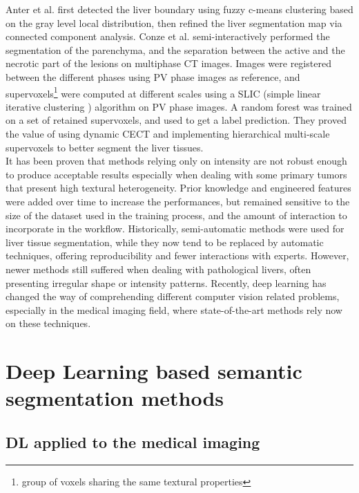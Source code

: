 Anter et al. \cite{Anter2014} first detected the liver boundary using fuzzy c-means
clustering based on the gray level local distribution, then refined the
liver segmentation map via connected component analysis. Conze et al. \cite{Conze2017} semi-interactively performed 
the segmentation of the parenchyma, and the separation between 
the active and the necrotic part of the lesions on multiphase CT images.
Images were registered between the different phases using PV phase images as reference, and
supervoxels\footnote{group of voxels sharing the same textural properties}
were computed at different scales using a SLIC (simple linear iterative clustering ) 
algorithm on PV phase images. A random forest was trained 
on a set of retained supervoxels, and used to get a label prediction. 
They proved the value of using dynamic CECT and implementing 
hierarchical multi-scale supervoxels to better segment the liver tissues.\\
It has been proven that methods relying only on intensity are not robust
enough to produce acceptable results especially when dealing with some
primary tumors that present high textural heterogeneity. Prior knowledge
and engineered features were added over time to increase the
performances, but remained sensitive to the size of the dataset used in
the training process, and the amount of interaction to incorporate in
the workflow.
Historically, semi-automatic methods were used for liver tissue
segmentation, while they now tend to be replaced by automatic
techniques, offering reproducibility and fewer interactions with
experts. However, newer methods still suffered when dealing with
pathological livers, often presenting irregular shape or intensity
patterns.
Recently, deep learning has changed the way of comprehending different
computer vision related problems, especially in the medical imaging
field, where state-of-the-art methods rely now on these techniques.


\section{Deep Learning based semantic segmentation methods}

\subsection{DL applied to the medical imaging}

